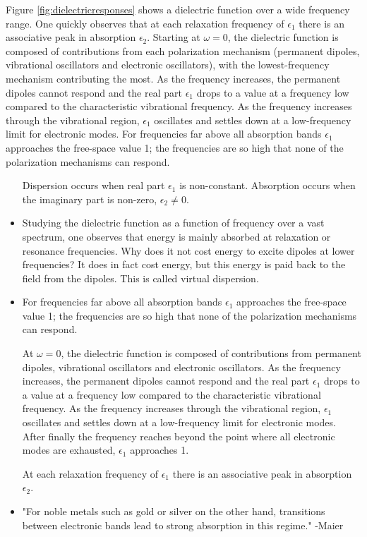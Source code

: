Figure \ref{fig:dielectricresponses} shows a dielectric function over a wide frequency range. One quickly observes that at each relaxation frequency of $\epsilon_1$ there is an associative peak in absorption $\epsilon_2$. Starting at $\omega=0$, the dielectric function is composed of contributions from each polarization mechanism (permanent dipoles, vibrational oscillators and electronic oscillators), with the lowest-frequency mechanism contributing the most. As the frequency increases, the permanent dipoles cannot respond and the real part $\epsilon_1$ drops to a value at a frequency low compared to the characteristic vibrational frequency. As the frequency increases through the vibrational region, $\epsilon_1$ oscillates and settles down at a low-frequency limit for electronic modes. For frequencies far above all absorption bands $\epsilon_1$ approaches the free-space value 1; the frequencies are so high that none of the polarization mechanisms can respond.
\begin{itemize}
    \item [Dispersion occurs when real part $\epsilon_1$ is non-constant. Absorption occurs when the imaginary part is non-zero, $\epsilon_2 \neq 0$.]
    
    \item Studying the dielectric function as a function of frequency over a vast spectrum, one observes that energy is mainly absorbed at relaxation or resonance frequencies. Why does it not cost energy to excite dipoles at lower frequencies? It does in fact cost energy, but this energy is paid back to the field from the dipoles. This is called virtual dispersion.
    
    \item For frequencies far above all absorption bands $\epsilon_1$ approaches the free-space value 1; the frequencies are so high that none of the polarization mechanisms can respond.
    
    At $\omega=0$, the dielectric function is composed of contributions from permanent dipoles, vibrational oscillators and electronic oscillators. As the frequency increases, the permanent dipoles cannot respond and the real part $\epsilon_1$ drops to a value at a frequency low compared to the characteristic vibrational frequency. As the frequency increases through the vibrational region, $\epsilon_1$ oscillates and settles down at a low-frequency limit for electronic modes. After finally the frequency reaches beyond the point where all electronic modes are exhausted, $\epsilon_1$ approaches 1.
    
    At each relaxation frequency of $\epsilon_1$ there is an associative peak in absorption $\epsilon_2$.
    \item "For noble metals such
as gold or silver on the other hand, transitions between electronic bands lead
to strong absorption in this regime." -Maier
\end{itemize}


